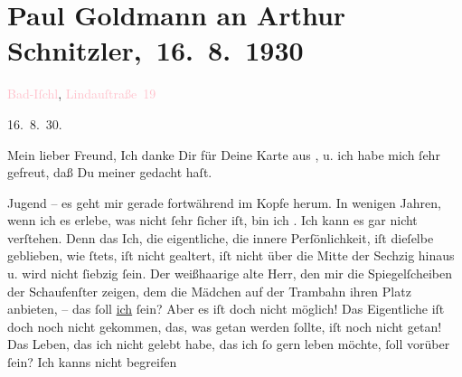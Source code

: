 

\renewcommand{\erwaehntePersonen}{Personen: Eva Marie Goldmann, Franziska Goldmann, Heinrich Schnitzler}
\renewcommand{\erwaehnteOrte}{Orte: Bad Ischl, Le Prese, Lindaustraße, Wien}
\renewcommand{\erwaehnteWerke}{}
\section[ Paul Goldmann an Arthur Schnitzler, 16. 8. 1930]{Paul Goldmann an Arthur Schnitzler, 16. 8. 1930}
\nopagebreak{}
\rehead{ }\normalsize\beginnumbering{}
\toendnotes[C]{\smallbreak\pagebreak[2]}
\toendnotes[C]{\smallbreak}
\pstart
           {\pb}\textcolor{pink}{Bad-Iſchl}{}\ledrightnote{\textcolor{pink}{Bad Ischl}}, \textcolor{pink}{Lindauſtraße 19}{}\ledrightnote{\textcolor{pink}{Lindaustraße}}\pend
           
\pstart
           \raggedleft{}16. 8. 30.
               \pend
           
\pstart{}Mein lieber Freund,\pend
\pstart
           Ich danke Dir für Deine Karte aus \label{K_L03482-1v}\label{K_L03482-1h}, u. ich habe mich ſehr gefreut, daß Du meiner gedacht haſt.\pend
           
\pstart
           Jugend – es geht mir gerade fortwährend im Kopfe herum. In wenigen Jahren,  wenn ich es erlebe, was nicht ſehr ſicher iſt, bin
               ich \label{K_L03482-2v}\label{K_L03482-2h}. Ich kann es gar nicht verſtehen. Denn das
               Ich, die eigentliche, die innere Perſönlichkeit, iſt dieſelbe geblieben, wie ſtets,
               iſt nicht gealtert, {\pb}iſt nicht über die Mitte
               der Sechzig hinaus u. wird nicht ſiebzig ſein. Der weißhaarige alte Herr, den mir die
               Spiegelſcheiben der Schaufenſter zeigen, dem die Mädchen auf der Trambahn ihren Platz
               anbieten, – das ſoll \uline{ich} ſein? Aber es iſt doch nicht
               möglich! Das Eigentliche iſt doch noch nicht gekommen, das, was getan werden ſollte,
               iſt noch nicht getan! Das Leben, das ich nicht gelebt habe, das ich ſo gern leben
               möchte, ſoll vorüber ſein? Ich kanns nicht begreifen{\dotsfive}\pend
           

